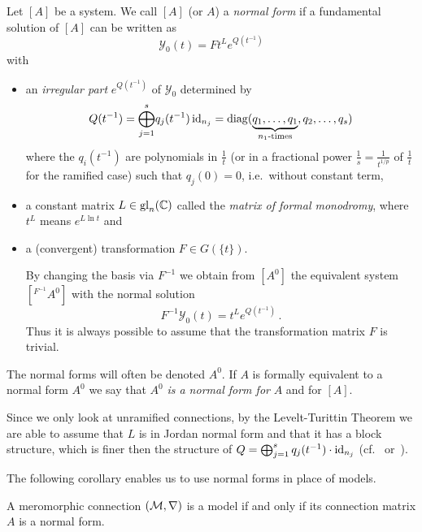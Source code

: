 \begin{defn}\label{defn:normSol}
  Let $[A]$ be a system.
  We call $[A]$ (or $A$) a \emph{normal form} if a fundamental solution of
  $[A]$ can be written as
  \[
    \mathcal{Y}_0(t)=F t^L e^{Q(t^{-1})}
  \]
  with
  \begin{itemize}
    \item an \emph{irregular part} $e^{Q(t^{-1})}$ of $\mathcal{Y}_0$
      determined by
      \[
        Q(t^{-1})=\underset{j=1}{\overset{s}{\bigoplus}}q_j(t^{-1})\id_{n_j}
          =\diag(\underset{n_1\text{-times}}{\underbrace{%
          q_1,\dots,q_1}},q_2,\dots,q_s)
      \]
      where the $q_i(t^{-1})$ are polynomials in $\frac{1}{t}$ (or in a
      fractional power $\frac{1}{s}=\frac{1}{t^{1/p}}$ of $\frac{1}{t}$ for the
      ramified case) such that $q_j(0)=0$, i.e.\ without constant term,
    \item a constant matrix $L\in\operatorname{gl}_n(\mathbb{C})$ called the \emph{matrix of formal
      monodromy}, where $t^L$ means $e^{L\ln t}$ and
    \item a (convergent) transformation $F\in G(\!\{t\}\!)$.
      \begin{s-rem}
        By changing the basis via $F^{-1}$ we obtain from $[A^0]$ the
        equivalent system $[{}^{F^{-1}}\!A^0]$ with the normal solution
        \[
          F^{-1}\mathcal{Y}_0(t)=t^L e^{Q(t^{-1})} \,.
        \]
        Thus it is always possible to assume that the transformation matrix $F$
        is trivial.
      \end{s-rem}
  \end{itemize}
  The normal forms will often be denoted $A^0$.
  If $A$ is formally equivalent to a normal form $A^0$ we say that $A^0$
  \emph{is a normal form for} $A$ and for $[A]$.
\end{defn}
\begin{cor}\label{cor:structuralAssumptions}
  Since we only look at unramified connections, by the Levelt-Turittin Theorem
  we are able to assume that $L$ is in Jordan normal form and that it has a
  block structure, which is finer then the structure of
  $Q=\bigoplus_{j=1}^sq_j(t^{-1})\cdot\operatorname{id}_{n_j}$
  (cf.~\cite[Sec.1]{Remy2014} or~\cite[Sec.4]{Martinet1991}).
\end{cor}
The following corollary enables us to use normal forms in place of models.
\begin{cor}
  A meromorphic connection $(\mathcal{M},\nabla)$ is a model if and only if its
  connection matrix $A$ is a normal form.
\end{cor}

